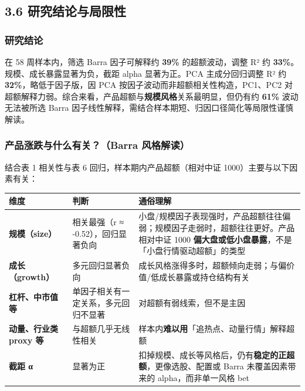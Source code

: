 \documentclass[
]{article}
\begin{document}
\subsection{3.6
研究结论与局限性}\label{ux7814ux7a76ux7ed3ux8bbaux4e0eux5c40ux9650ux6027}

\subsubsection{研究结论}\label{ux7814ux7a76ux7ed3ux8bba}

在 58 周样本内，筛选 Barra 因子可解释约 \textbf{39\%} 的超额波动，调整
R² 约 \textbf{33\%}。规模、成长暴露显著为负，截距 alpha 显著为正。PCA
主成分回归调整 R² 约 \textbf{32\%}，略低于因子版，因 PCA
按因子波动而非超额相关性构造，PC1、PC2
对超额解释力弱。综合来看，产品超额与\textbf{规模风格}关系最明显，但仍有约
\textbf{61\%} 波动无法被所选 Barra
因子线性解释，需结合样本期短、归因口径简化等局限性谨慎解读。

\subsubsection{产品涨跌与什么有关？（Barra
风格解读）}\label{ux4ea7ux54c1ux6da8ux8dccux4e0eux4ec0ux4e48ux6709ux5173barra-ux98ceux683cux89e3ux8bfb}

结合表 1 相关性与表 6 回归，样本期内产品超额（相对中证
1000）主要与以下因素有关：

\begin{longtable}[]{@{}
  >{\raggedright\arraybackslash}p{}
  >{\raggedright\arraybackslash}p{}
  >{\raggedright\arraybackslash}p{}@{}}
\toprule\noalign{}
\begin{minipage}[b]{\linewidth}\raggedright
维度
\end{minipage} & \begin{minipage}[b]{\linewidth}\raggedright
判断
\end{minipage} & \begin{minipage}[b]{\linewidth}\raggedright
通俗理解
\end{minipage} \\
\midrule\noalign{}
\endhead
\bottomrule\noalign{}
\endlastfoot
\textbf{规模（size）} & 相关最强（r ≈ -0.52），回归显著负向 &
小盘/规模因子表现强时，产品超额往往偏弱；规模因子走弱时，超额往往更好。产品相对中证
1000 \textbf{偏大盘或低小盘暴露}，不是「小盘行情驱动超额」的类型 \\
\textbf{成长（growth）} & 多元回归显著负向 &
成长风格涨得多时，超额倾向走弱；与偏价值/低成长暴露或持仓结构有关 \\
\textbf{杠杆、中市值等} & 单因子相关有一定关系，多元回归不显著 &
对超额有弱线索，但不是主因 \\
\textbf{动量、行业类 proxy 等} & 与超额几乎无线性相关 &
样本内\textbf{难以用}「追热点、动量行情」解释超额 \\
\textbf{截距 α} & 显著为正 &
扣掉规模、成长等风格后，仍有\textbf{稳定的正超额}，更像选股、配置或
Barra 未覆盖因素带来的 alpha，而非单一风格 bet \\
\end{longtable}
\end{document}
